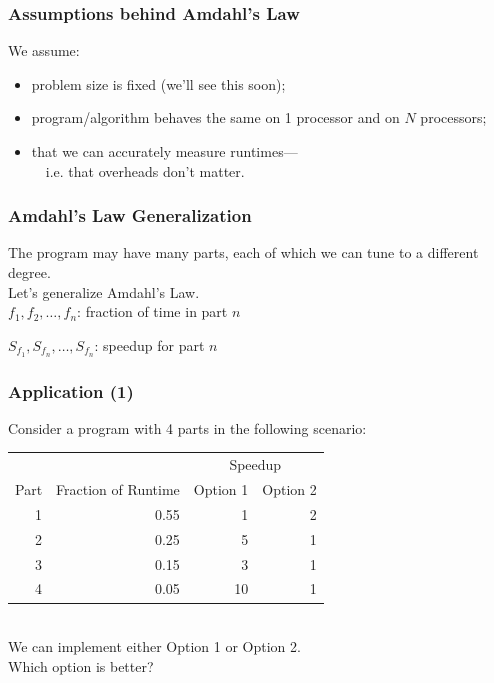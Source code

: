 \begin{frame}
  \frametitle{Assumptions behind Amdahl's Law}

    We assume:
    \begin{itemize}
    \item problem size is fixed (we'll see this soon);
    \item program/algorithm behaves the same on 1 processor and on $N$ processors;
    \item that we can accurately measure runtimes---\\ ~~i.e. that overheads don't matter.
    \end{itemize}
  
\end{frame}

\begin{frame}
  \frametitle{Amdahl's Law Generalization}

  \hspace*{2em} The program may have many parts, each of which we can tune to
  a different degree.\\[1em]

  Let's generalize Amdahl's Law.\\[1em]

  $f_1, f_2, \ldots, f_n$: fraction of time in part $n$

  $S_{f_1}, S_{f_n}, \ldots, S_{f_n}$: speedup for part $n$

  \vfill
  \begin{center}
  \structure{\[\mbox{\em speedup} = \frac{1}{\frac{f_1}{S_{f_1}} + \frac{f_2}{S_{f_2}} + \ldots +
    \frac{f_n}{S_{f_n}}}\]}
  \end{center}
\end{frame}


\begin{frame}
  \frametitle{Application (1)}

  \hspace*{2em} 
Consider a program with 4 parts in the following scenario:\\[2em]
    \begin{tabular}{r|r|r|r}
    \multicolumn{2}{l}{} & \multicolumn{2}{c}{Speedup} \\
    Part & Fraction of Runtime & Option 1 & Option 2\\
    \hline
    1 & 0.55 & 1  & 2\\
    2 & 0.25 & 5  & 1\\
    3 & 0.15 & 3  & 1\\
    4 & 0.05  & 10 & 1\\
  \end{tabular}

~\\[2em]
  We can implement either Option 1 or Option 2. \\
  Which option is better?

\end{frame}

